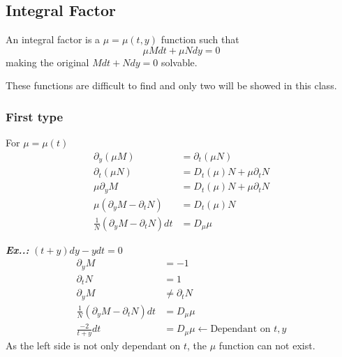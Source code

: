\documentclass[a4paper]{article}
\begin{document}
\subsection{Integral Factor}
\setcounter{equation}{0}

An integral factor is a $\mu = \mu(t,y)$ function such that 
$$
\mu Mdt+\mu Ndy=0
$$
making the original $Mdt+Ndy=0$ solvable.

These functions are difficult to find and only two will be showed in this class.

\subsubsection{First type}

For $\mu = \mu(t)$
\begin{align}
    \partial_y(\mu M)&=\partial_t(\mu N) \\
    \partial_t(\mu N)&=D_t(\mu) N+\mu \partial_tN \\
    \mu \partial_yM&=D_t(\mu)N+\mu \partial_tN \\
    \mu\left(\partial_yM-\partial_tN\right)&=D_t(\mu)N \\
    \frac{1}{N}\left(\partial_yM-\partial_tN\right)dt&=D_\mu \mu
\end{align}

\vspace{2ex}\textit{\textbf{Ex.\thesection.\theprob:}} $(t+y)dy-ydt=0$
\begin{align}
    \partial_yM&=-1 \\
    \partial_tN&=1 \\
    \partial_yM&\neq \partial_tN \\
    \frac{1}{N}\left(\partial_yM-\partial_tN\right)dt&=D_\mu\mu \\
    \frac{-2}{t+y}dt&=D_\mu\mu \leftarrow\text{Dependant on }t,y
\end{align}
As the left side is not only dependant on $t$, the $\mu$ function can not exist.
\end{document}
